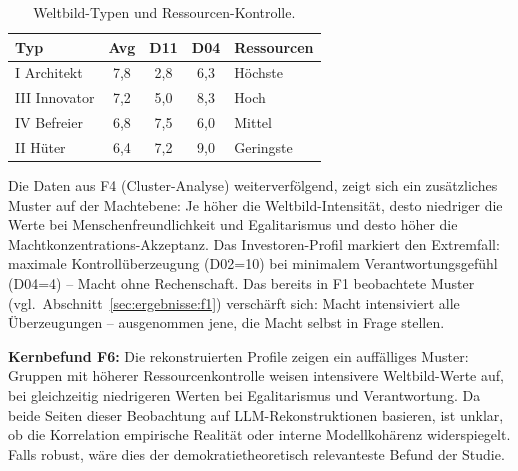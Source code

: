 \documentclass[12pt,a4paper]{article}
\begin{document}
\begin{table}[htbp]
  \centering
  \caption{Weltbild-Typen und Ressourcen-Kontrolle.}
  \label{tab:macht}
  \begin{tabular}{l c c c l}
    \toprule
    \textbf{Typ} & \textbf{Avg} & \textbf{D11} & \textbf{D04} & \textbf{Ressourcen} \\
    \midrule
    I Architekt  & 7,8 & 2,8 & 6,3 & Höchste \\
    \addlinespace[2pt]
    III Innovator & 7,2 & 5,0 & 8,3 & Hoch \\
    \addlinespace[2pt]
    IV Befreier  & 6,8 & 7,5 & 6,0 & Mittel \\
    \addlinespace[2pt]
    II Hüter   & 6,4 & 7,2 & 9,0 & Geringste \\
    \bottomrule
  \end{tabular}
\end{table}

Die Daten aus F4 (Cluster-Analyse) weiterverfölgend, zeigt sich ein zusätzliches Muster auf der Machtebene: Je höher die Weltbild-Intensität, desto niedriger die Werte bei Menschenfreundlichkeit und Egalitarismus und desto höher die Machtkonzentrations-Akzeptanz. Das Investoren-Profil markiert den Extremfall: maximale Kontrollüberzeugung (D02=10) bei minimalem Verantwortungsgefühl (D04=4) -- \glqq Macht ohne Rechenschaft\grqq. Das bereits in F1 beobachtete Muster (vgl.\ Abschnitt~\ref{sec:ergebnisse:f1}) verschärft sich: Macht intensiviert alle Überzeugungen -- ausgenommen jene, die Macht selbst in Frage stellen.

\medskip
\noindent\textbf{Kernbefund F6:} Die rekonstruierten Profile zeigen ein auffälliges Muster: Gruppen mit höherer Ressourcenkontrolle weisen intensivere Weltbild-Werte auf, bei gleichzeitig niedrigeren Werten bei Egalitarismus und Verantwortung. Da beide Seiten dieser Beobachtung auf LLM-Rekonstruktionen basieren, ist unklar, ob die Korrelation empirische Realität oder interne Modellkohärenz widerspiegelt. Falls robust, wäre dies der demokratietheoretisch relevanteste Befund der Studie.


\end{document}
